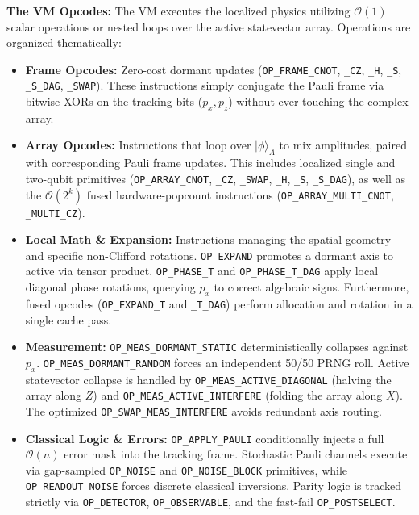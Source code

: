 \documentclass[11pt]{article}
\begin{document}
\textbf{The VM Opcodes:} The VM executes the localized physics utilizing $\mathcal{O}(1)$ scalar operations or nested loops over the active statevector array. Operations are organized thematically:
\begin{itemize}
    \item \textbf{Frame Opcodes:} Zero-cost dormant updates (\texttt{OP\_FRAME\_CNOT}, \texttt{\_CZ}, \texttt{\_H}, \texttt{\_S}, \texttt{\_S\_DAG}, \texttt{\_SWAP}). These instructions simply conjugate the Pauli frame via bitwise XORs on the tracking bits ($p_x, p_z$) without ever touching the complex array.
    \item \textbf{Array Opcodes:} Instructions that loop over $|\phi\rangle_A$ to mix amplitudes, paired with corresponding Pauli frame updates. This includes localized single and two-qubit primitives (\texttt{OP\_ARRAY\_CNOT}, \texttt{\_CZ}, \texttt{\_SWAP}, \texttt{\_H}, \texttt{\_S}, \texttt{\_S\_DAG}), as well as the $\mathcal{O}(2^k)$ fused hardware-popcount instructions (\texttt{OP\_ARRAY\_MULTI\_CNOT}, \texttt{\_MULTI\_CZ}).
    \item \textbf{Local Math \& Expansion:} Instructions managing the spatial geometry and specific non-Clifford rotations. \texttt{OP\_EXPAND} promotes a dormant axis to active via tensor product. \texttt{OP\_PHASE\_T} and \texttt{OP\_PHASE\_T\_DAG} apply local diagonal phase rotations, querying $p_x$ to correct algebraic signs. Furthermore, fused opcodes (\texttt{OP\_EXPAND\_T} and \texttt{\_T\_DAG}) perform allocation and rotation in a single cache pass.
    \item \textbf{Measurement:} \texttt{OP\_MEAS\_DORMANT\_STATIC} deterministically collapses against $p_x$. \texttt{OP\_MEAS\_DORMANT\_RANDOM} forces an independent 50/50 PRNG roll. Active statevector collapse is handled by \texttt{OP\_MEAS\_ACTIVE\_DIAGONAL} (halving the array along $Z$) and \texttt{OP\_MEAS\_ACTIVE\_INTERFERE} (folding the array along $X$). The optimized \texttt{OP\_SWAP\_MEAS\_INTERFERE} avoids redundant axis routing.
    \item \textbf{Classical Logic \& Errors:} \texttt{OP\_APPLY\_PAULI} conditionally injects a full $\mathcal{O}(n)$ error mask into the tracking frame. Stochastic Pauli channels execute via gap-sampled \texttt{OP\_NOISE} and \texttt{OP\_NOISE\_BLOCK} primitives, while \texttt{OP\_READOUT\_NOISE} forces discrete classical inversions. Parity logic is tracked strictly via \texttt{OP\_DETECTOR}, \texttt{OP\_OBSERVABLE}, and the fast-fail \texttt{OP\_POSTSELECT}.
\end{itemize}
\end{document}
